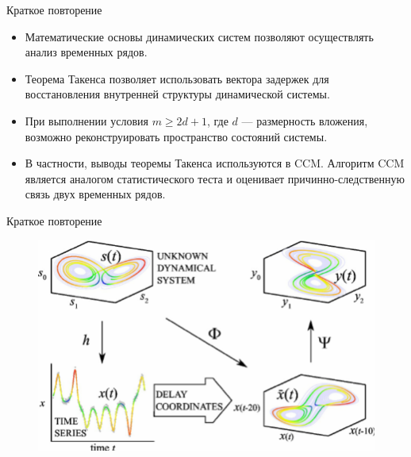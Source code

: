 
\usepackage{tikz}
\usepackage{amsmath}
\usepackage[english,russian]{babel}
\usepackage[labelformat=empty]{caption}

\usepackage{graphicx,animate}
\usepackage{animate}

\usetikzlibrary{arrows,shapes,positioning,shadows,trees}
\newcommand*{\defeq}{\stackrel{\text{def}}{=}}


\begin{frame}[plain]
\titlepage
\end{frame}
\begin{frame}{Краткое повторение}
\begin{itemize}
    \item Математические основы динамических систем позволяют осуществлять анализ временных рядов.
    \item Теорема Такенса позволяет использовать вектора задержек для восстановления внутренней структуры динамической системы.
    \item При выполнении условия $m \geq 2d + 1$, где $d$ — размерность вложения, возможно реконструировать пространство состояний системы.
    \item В частности, выводы теоремы Такенса используются в CCM. Алгоритм CCM является аналогом статистического теста и оценивает причинно-следственную связь двух временных рядов.
\end{itemize}
\end{frame}
\begin{frame}{Краткое повторение}
\begin{figure}
    \centering
    \includegraphics[width=\textwidth]{lecture_4/figs/CCM-1.png}
\end{figure}
\end{frame}
